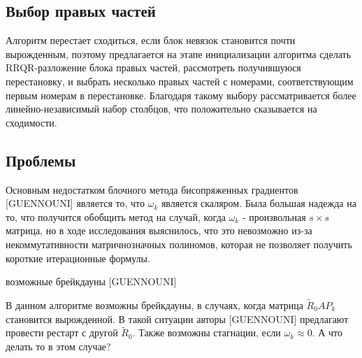 \subsection{Выбор правых частей}
Алгоритм перестает сходиться, если блок невязок становится почти вырожденным, поэтому предлагается
на этапе инициализации алгоритма сделать RRQR-разложение блока правых частей, рассмотреть получившуюся
перестановку, и выбрать несколько правых частей с номерами, соответствующим первым номерам в перестановке.
Благодаря такому выбору рассматривается более линейно-независимый набор столбцов, что положительно сказывается
на сходимости.    

\subsection{Проблемы}
\par Основным недостатком блочного метода бисопряженных градиентов [GUENNOUNI] является то,
что $\omega_k$ является скаляром. Была большая надежда на то, что получится обобщить метод
на случай, когда $\omega_k$ - произвольная $s \times s$ матрица, но в ходе исследования выяснилось,
что это невозможно из-за некоммутативности матричнозначных полиномов, которая не позволяет получить короткие итерационные формулы.
\par возможные брейкдауны [GUENNOUNI]
\par В данном алгоритме возможны брейкдауны, в случаях, когда матрица $\tilde{R}_0AP_k$ становится
вырожденной. В такой ситуации авторы [GUENNOUNI] предлагают провести рестарт с другой $\tilde{R}_0$.
Также возможны стагнации, если $\omega_k \approx 0$. {\color{red} А что делать то в этом случае?}

\newpage
